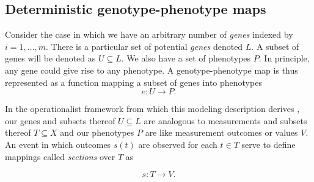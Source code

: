 \subsection*{Deterministic genotype-phenotype maps}
Consider the case in which we have an arbitrary number of \emph{genes} indexed by $i=1, \ldots, m$. There is a particular set of potential \emph{genes} denoted $L$. A subset of genes will be denoted as $U \subseteq L$. We also have a set of phenotypes $P$. In principle, any gene could give rise to any phenotype. A genotype-phenotype map is thus represented as a function mapping a subset of genes into phenotypes
$$
e \colon U \rightarrow  P.
$$

In the operationalist framework from which this modeling description derives \cite{Abramsky2011}, our genes and subsets thereof $U \subseteq L$ are analogous to measurements and subsets thereof $T \subseteq X$ and our phenotypes $P$ are like measurement outcomes or values $V$. An event in which outcomes $s(t)$ are observed for each $t \in T$ serve to define mappings called \emph{sections} over $T$ as

$$
s \colon T \rightarrow V.
$$

